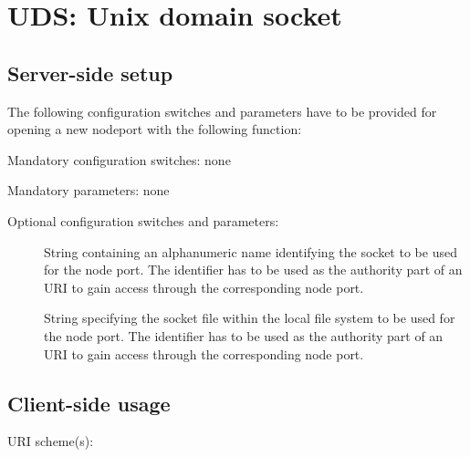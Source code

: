 \section{UDS: Unix domain socket}
\label{sect:nodeport_uds}


\subsection{Server-side setup}

The following configuration switches and parameters have to be provided for opening a new nodeport with the following function:


Mandatory configuration switches: none

Mandatory parameters: none

Optional configuration switches and parameters:
\begin{description}

  \item[]
String containing an alphanumeric name identifying the socket to be used for the node port.
The identifier has to be used as the authority part of an URI to gain access through the corresponding node port.

  \item[]
String specifying the socket file within the local file system to be used for the node port.
The identifier has to be used as the authority part of an URI to gain access through the corresponding node port.

\end{description}


\subsection{Client-side usage}

URI scheme(s): \\
